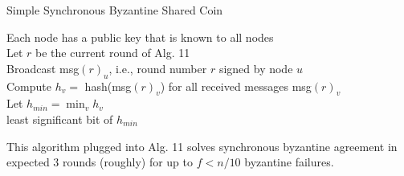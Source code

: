 \begin{algorithm}[H]
\caption{Simple Synchronous Byzantine Shared Coin }
	Each node has a public key that is known to all nodes \\
	Let $r$ be the current round of Alg. 11 \\
	Broadcast msg$(r)_u$, i.e., round number $r$ signed by node $u$ \\
	Compute $h_v =$ hash(msg$(r)_v$) for all received messages msg$(r)_v$ \\
	Let $h_{min} = \min_v h_v$ \\
    \Return least significant bit of $h_{min}$
\end{algorithm}
\medskip

This algorithm plugged into Alg. 11 solves synchronous byzantine agreement in expected $3$ rounds (roughly) for up to $f < n/10$ byzantine failures.
